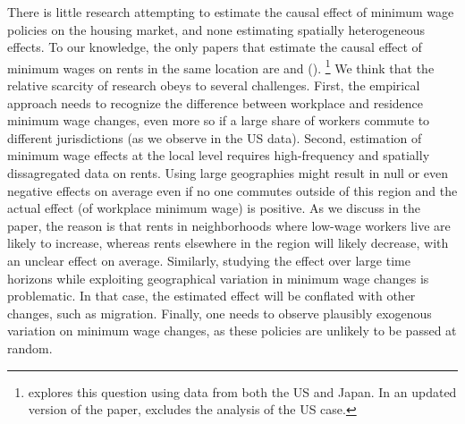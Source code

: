 
There is little research attempting to estimate the causal effect of minimum wage 
policies on the housing market, and none estimating spatially heterogeneous effects.
To our knowledge, the only papers that estimate the causal effect of minimum wages 
on rents in the same location are \textcite{Tidemann2018} and \citeauthor{Yamagishi2019} 
(\citeyear{Yamagishi2019, Yamagishi2021}).%
\footnote{\textcite{Yamagishi2019} explores this question using data from both the
US and Japan. In an updated version of the paper, \textcite{Yamagishi2021} excludes
the analysis of the US case.}
We think that the relative scarcity of research obeys to several challenges.
First, the empirical approach needs to recognize the difference between workplace
and residence minimum wage changes, even more so if a large share of workers
commute to different jurisdictions (as we observe in the US data).
Second, estimation of minimum wage effects at the local level requires high-frequency
and spatially dissagregated data on rents.
Using large geographies might result in null or even negative effects on average
even if no one commutes outside of this region and the actual effect (of workplace 
minimum wage) is positive.
As we discuss in the paper, the reason is that rents in neighborhoods where low-wage
workers live are likely to increase, whereas rents elsewhere in the region will 
likely decrease, with an unclear effect on average.
Similarly, studying the effect over large time horizons while exploiting geographical
variation in minimum wage changes is problematic.
In that case, the estimated effect will be conflated with other changes, such as
migration.
Finally, one needs to observe plausibly exogenous variation on minimum wage changes,
as these policies are unlikely to be passed at random.


